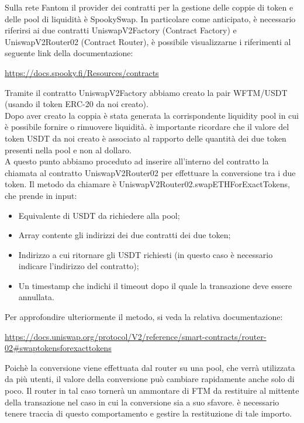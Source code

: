 Sulla rete Fantom il provider dei contratti per la gestione delle coppie di token e delle pool di liquidità è SpookySwap. In particolare come anticipato, è necessario riferirsi ai due contratti UniswapV2Factory (Contract Factory) e UniswapV2Router02 (Contract Router), è possibile visualizzarne i riferimenti al seguente link della documentazione:

\begin{center}
    \href{https://docs.spooky.fi/Resources/contracts}{https://docs.spooky.fi/Resources/contracts}
\end{center}

Tramite il contratto UniswapV2Factory abbiamo creato la pair WFTM/USDT (usando il token ERC-20 da noi creato).\\ Dopo aver creato la coppia è stata generata la corrispondente liquidity pool in cui è possibile fornire o rimuovere liquidità. 
è importante ricordare che il valore del token USDT da noi creato è associato al rapporto delle quantità dei due token presenti nella pool e non al dollaro.\\

A questo punto abbiamo proceduto ad inserire all'interno del contratto la chiamata al contratto UniswapV2Router02 per effettuare la conversione tra i due token.
Il metodo da chiamare è UniswapV2Router02.swapETHForExactTokens, che prende in input:

\begin{itemize}
    \item Equivalente di USDT da richiedere alla pool;
    \item Array contente gli indirizzi dei due contratti dei due token;
    \item Indirizzo a cui ritornare gli USDT richiesti (in questo caso è necessario indicare l'indirizzo del contratto);
    \item Un timestamp che indichi il timeout dopo il quale la transazione deve essere annullata.
\end{itemize}

Per approfondire ulteriormente il metodo, si veda la relativa documentazione:

\begin{center}
    \href{https://docs.uniswap.org/protocol/V2/reference/smart-contracts/router-02\#swaptokensforexacttokens}{https://docs.uniswap.org/protocol/V2/reference/smart-contracts/router-02\#swaptokensforexacttokens}
\end{center}

Poichè la conversione viene effettuata dal router su una pool, che verrà utilizzata da più utenti, il valore della conversione può cambiare rapidamente anche solo di poco. Il router in tal caso tornerà un ammontare di FTM da restituire al mittente della transazione nel caso in cui la conversione sia a suo sfavore. è necessario tenere traccia di questo comportamento e gestire la restituzione di tale importo.

